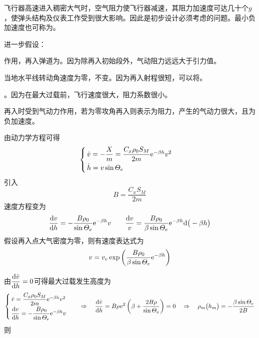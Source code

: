 飞行器高速进入稠密大气时，空气阻力使飞行器减速，其阻力加速度可达几十个$g$，使弹头结构及仪表工作受到很大影响。因此\red[最小负加速度]是初步设计必须考虑的问题。最小负加速度也可称为。

进一步假设：

\noa[1] \red[忽略地球引力]作用，再入弹道为\red[直线弹道]。因为除再入初始段外，气动阻力远远大于引力值。

\noa[2] 当地水平线转动角速度为零，\red[当地速度倾角]不变。因为再入射程很短，可以将\red[地球看成平面]。

\noa[3] \red[阻力系数为常数]。因为在最大过载前，飞行速度很大，阻力系数很小。

\quad 再入时受到气动力作用，若为零攻角再入则表示为阻力，产生的气动力很大，且为负加速度。

由动力学方程可得
\begin{equation}
	\begin{cases}
		\, \dot{v} = - \dfrac{X}{m} = \dfrac{C_x \rho_0 S_M}{2 m} {\rm{e}}^{- \beta h} v^2 \\[0.5em]
		\, \dot{h} = v \sin \varTheta_e
	\end{cases}
\end{equation}
引入
\begin{equation}
	B = \dfrac{C_x S_M}{2 m}
\end{equation}
速度方程变为
\begin{equation}
	\dfrac{{\rm{d}} v}{{\rm{d}} h} = - \dfrac{B \rho_0}{\sin \varTheta_e}{\rm{e}}^{-\beta h}v \qquad \dfrac{{\rm{d}} v}{v} = \dfrac{B \rho_0}{\beta \sin \varTheta_e}{\rm{e}}^{-\beta h} {\rm{d}} \big(- \beta h\big)
\end{equation}
假设再入点大气密度为零，则有速度表达式为
\begin{equation}
	v = v_e \exp \left(\dfrac{B \rho_0}{\beta \sin \varTheta_e} {\rm{e}} ^{- \beta h}\right)
	\label{vh}
\end{equation}

由$\dfrac{{\rm{d}} \dot{v}}{{\rm{d}} h} = 0$可得最大过载发生高度为
\begin{equation}
	\begin{cases}
		\, \dot{v} = \dfrac{C_x \rho_0 S_M}{2m}{\rm{e}}^{-\beta h}v^2 \\[0.5em]
		\, \dfrac{{\rm{d}} v}{{\rm{d}} h} = - \dfrac{B \rho_0}{\sin \varTheta_e}{\rm{e}}^{-\beta h}v
	\end{cases}
	\quad \Rightarrow \quad 
	\dfrac{{\rm{d}} \dot{v}}{{\rm{d}} h} = B \rho v^2 \left(\beta + \dfrac{2B\rho}{\sin \varTheta_e}\right) = 0 \quad \Rightarrow \quad \rho_m\big(h_m\big) = - \dfrac{\beta \sin \varTheta_e}{2 B}
\end{equation}
则

